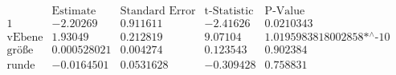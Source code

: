 \[\begin{array}{l|llll}
 \text{} & \text{Estimate} & \text{Standard Error} & \text{t-Statistic} & \text{P-Value} \\
\hline
 1 & -2.20269 & 0.911611 & -2.41626 & 0.0210343 \\
 \text{vEbene} & 1.93049 & 0.212819 & 9.07104 & \text{1.0195983818002858$\grave{ }$*${}^{\wedge}$-10} \\
 \text{gr{\" o}{\ss}e} & 0.000528021 & 0.004274 & 0.123543 & 0.902384 \\
 \text{runde} & -0.0164501 & 0.0531628 & -0.309428 & 0.758831 \\
\end{array}\]

